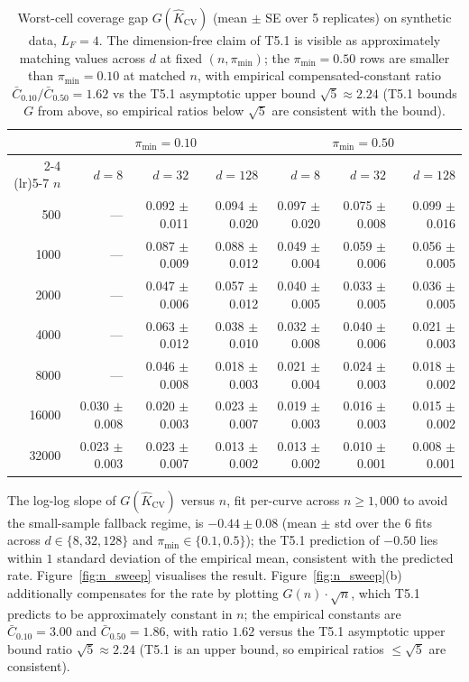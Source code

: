 \begin{table}[h]
\centering
\footnotesize
\caption{Worst-cell coverage gap $G(\hat K_{\mathrm{CV}})$ (mean $\pm$ SE over 5 replicates) on synthetic data, $L_F = 4$. The dimension-free claim of T5.1 is visible as approximately matching values across $d$ at fixed $(n, \pi_{\min})$; the $\pi_{\min} = 0.50$ rows are smaller than $\pi_{\min} = 0.10$ at matched $n$, with empirical compensated-constant ratio $\bar C_{0.10} / \bar C_{0.50} = 1.62$ vs the T5.1 asymptotic upper bound $\sqrt{5} \approx 2.24$ (T5.1 bounds $G$ from above, so empirical ratios below $\sqrt{5}$ are consistent with the bound).}
\label{tab:synthetic_t5}
\setlength{\tabcolsep}{3pt}
\begin{tabular}{rrrrrrr}
\toprule
& \multicolumn{3}{c}{$\pi_{\min} = 0.10$} & \multicolumn{3}{c}{$\pi_{\min} = 0.50$} \\
\cmidrule(lr){2-4} \cmidrule(lr){5-7}
$n$ & $d{=}8$ & $d{=}32$ & $d{=}128$ & $d{=}8$ & $d{=}32$ & $d{=}128$ \\
\midrule
500    & --- & 0.092 $\pm$ 0.011 & 0.094 $\pm$ 0.020 & 0.097 $\pm$ 0.020 & 0.075 $\pm$ 0.008 & 0.099 $\pm$ 0.016 \\
1000   & --- & 0.087 $\pm$ 0.009 & 0.088 $\pm$ 0.012 & 0.049 $\pm$ 0.004 & 0.059 $\pm$ 0.006 & 0.056 $\pm$ 0.005 \\
2000   & --- & 0.047 $\pm$ 0.006 & 0.057 $\pm$ 0.012 & 0.040 $\pm$ 0.005 & 0.033 $\pm$ 0.005 & 0.036 $\pm$ 0.005 \\
4000   & --- & 0.063 $\pm$ 0.012 & 0.038 $\pm$ 0.010 & 0.032 $\pm$ 0.008 & 0.040 $\pm$ 0.006 & 0.021 $\pm$ 0.003 \\
8000   & --- & 0.046 $\pm$ 0.008 & 0.018 $\pm$ 0.003 & 0.021 $\pm$ 0.004 & 0.024 $\pm$ 0.003 & 0.018 $\pm$ 0.002 \\
16000  & 0.030 $\pm$ 0.008 & 0.020 $\pm$ 0.003 & 0.023 $\pm$ 0.007 & 0.019 $\pm$ 0.003 & 0.016 $\pm$ 0.003 & 0.015 $\pm$ 0.002 \\
32000  & 0.023 $\pm$ 0.003 & 0.023 $\pm$ 0.007 & 0.013 $\pm$ 0.002 & 0.013 $\pm$ 0.002 & 0.010 $\pm$ 0.001 & 0.008 $\pm$ 0.001 \\
\bottomrule
\end{tabular}
\end{table}

The log-log slope of $G(\hat K_{\mathrm{CV}})$ versus $n$, fit per-curve across $n \geq 1{,}000$ to avoid the small-sample fallback regime, is $-0.44 \pm 0.08$ (mean $\pm$ std over the 6 fits across $d \in \{8, 32, 128\}$ and $\pi_{\min} \in \{0.1, 0.5\}$); the T5.1 prediction of $-0.50$ lies within $1$ standard deviation of the empirical mean, consistent with the predicted rate. Figure~\ref{fig:n_sweep} visualises the result. Figure~\ref{fig:n_sweep}(b) additionally compensates for the rate by plotting $G(n) \cdot \sqrt{n}$, which T5.1 predicts to be approximately constant in $n$; the empirical constants are $\bar C_{0.10} = 3.00$ and $\bar C_{0.50} = 1.86$, with ratio $1.62$ versus the T5.1 asymptotic upper bound ratio $\sqrt{5} \approx 2.24$ (T5.1 is an upper bound, so empirical ratios $\leq \sqrt{5}$ are consistent).

